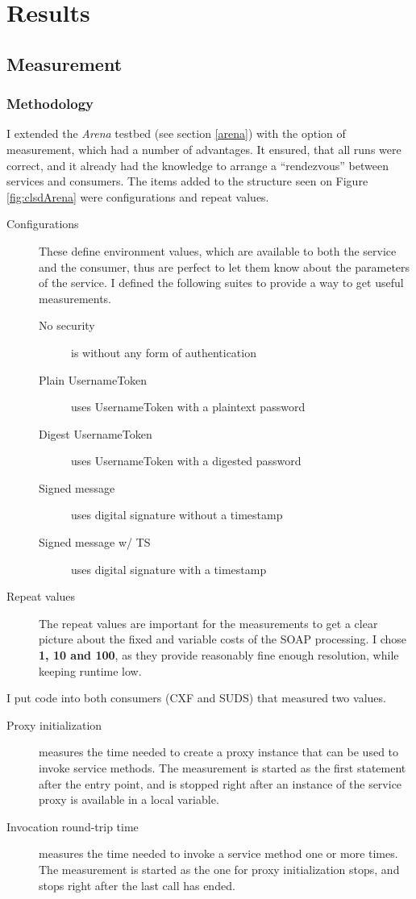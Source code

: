 \chapter{Results}

\section{Measurement}

\subsection{Methodology}

I extended the \emph{Arena} testbed (see section \ref{arena}) with the option of measurement, which had a number of advantages. It ensured, that all runs were correct, and it already had the knowledge to arrange a ``rendezvous'' between services and consumers. The items added to the structure seen on Figure \ref{fig:clsdArena} were configurations and repeat values.

\begin{description}
 \item[Configurations] These define environment values, which are available to both the service and the consumer, thus are perfect to let them know about the parameters of the service. I defined the following suites to provide a way to get useful measurements.
 \begin{description}
  \item[No security] is without any form of authentication
  \item[Plain UsernameToken] uses UsernameToken with a plaintext password
  \item[Digest UsernameToken] uses UsernameToken with a digested password
  \item[Signed message] uses digital signature without a timestamp
  \item[Signed message w/ TS] uses digital signature with a timestamp
 \end{description}
 \item[Repeat values] The repeat values are important for the measurements to get a clear picture about the fixed and variable costs of the SOAP processing. I chose \textbf{1, 10 and 100}, as they provide reasonably fine enough resolution, while keeping runtime low.
\end{description}

\noindent
I put code into both consumers (CXF and SUDS) that measured two values.
\begin{description}
 \item[Proxy initialization] measures the time needed to create a proxy instance that can be used to invoke service methods. The measurement is started as the first statement after the entry point, and is stopped right after an instance of the service proxy is available in a local variable.
 \item[Invocation round-trip time] measures the time needed to invoke a service method one or more times. The measurement is started as the one for proxy initialization stops, and stops right after the last call has ended.
\end{description}

